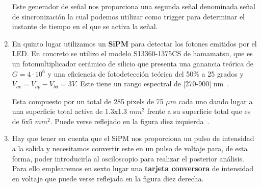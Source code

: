 \begin{enumerate}
Este generador de señal nos proporciona una segunda señal denominada señal de sincronización la cual podemos utilizar como trigger para determinar el instante de tiempo en el que se activa la señal.

\item {} En quinto lugar utilizamos un \textbf{SiPM} para detectar los fotones emitidos por el LED. En concreto se utilizo el modelo S13360-1375CS de hamamatsu, que es un fotomultiplicador cerámico de silicio que presenta una ganancia teórica de $G=4 \cdotp 10^6$ y una eficiencia de fotodetección teórica del 50\% a 25 grados y $V_{ov}=V_{op}-V_{bd}=3V$. Este tiene un rango espectral de [270-900] nm~\cite{datasheet SiPM}.

Esta compuesto por un total de 285 pixels de 75 $\mu m$ cada uno dando lugar a una superficie total activa de 1.3x1.3 $mm^2$ frente a su superficie total que es de 6x5 $mm^2$. Puede verse reflejado en la figura diez izquierda~\cite{datasheet SiPM}. 

\item {} Hay que tener en cuenta que el SiPM nos proporciona un pulso de intensidad a la salida y  necesitamos convertir este en un pulso de voltaje para, de esta forma, poder introducirla al osciloscopio para realizar el posterior análisis. Para ello emplearemos en sexto lugar una \textbf{tarjeta conversora} de intensidad en voltaje que puede verse reflejada en la figura diez derecha. 


\end{enumerate}
